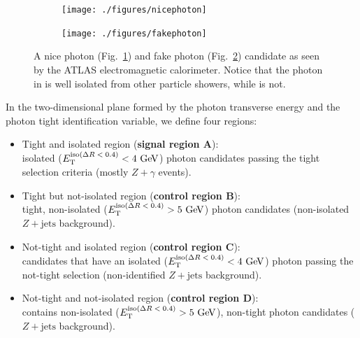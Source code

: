\begin{figure}[htbp]
   \centering 

    \begin{subfigure}[b]{0.45\textwidth}
        \centering
        \texttt{[image: ./figures/nicephoton]}
        \caption{}
        \label{fig:nicephoton}
    \end{subfigure}
    \quad 
    \begin{subfigure}[b]{0.45\textwidth}
        \centering
        \texttt{[image: ./figures/fakephoton]}
        \caption{}
        \label{fig:fakephoton}
    \end{subfigure}
    \caption{A nice photon (Fig.~\ref{fig:nicephoton}) and fake photon 
    (Fig.~\ref{fig:fakephoton}) candidate as seen by the ATLAS electromagnetic
    calorimeter. Notice that the photon in  is well isolated
    from other particle showers, while  is not.}
    \label{fig:photonshowers}
\end{figure}

In the two-dimensional plane formed by the photon transverse energy and
the photon tight identification variable, we define four regions:
\begin{itemize}
 \item Tight and isolated region (\textbf{signal region A}):\\
 isolated ($\et^{\text{iso($\Delta R < 0.4$)}} < 4 \GeV$) photon candidates 
 passing the tight selection criteria (mostly $Z+\gamma$ events). 
%
 \item Tight but not-isolated region (\textbf{control region B}):\\
 tight, non-isolated ($\et^{\text{iso($\Delta R < 0.4$)}} > 5 \GeV$) 
 photon candidates (non-isolated $Z+\text{jets}$ background).
%
 \item Not-tight and isolated region (\textbf{control region C}): \\
 candidates that have an isolated ($\et^{\text{iso($\Delta R < 0.4$)}} < 4 \GeV$)
 photon passing the not-tight selection (non-identified $Z+\text{jets}$ background). 
%
 \item Not-tight and not-isolated region (\textbf{control region D}): \\
 contains non-isolated ($\et^{\text{iso($\Delta R < 0.4$)}} > 5 \GeV$), 
 non-tight photon candidates ($Z+\text{jets}$ background).
\end{itemize}

